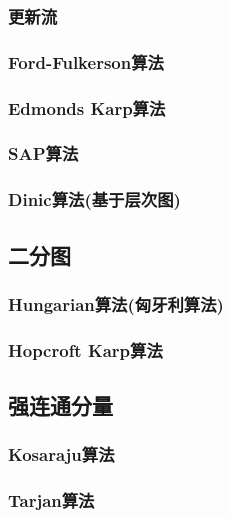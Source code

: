 \subsubsection{更新流}
\subsubsection{Ford-Fulkerson算法}
\subsubsection{Edmonds Karp算法}
\subsubsection{SAP算法}
\subsubsection{Dinic算法(基于层次图)}

\subsection{二分图}
\subsubsection{Hungarian算法(匈牙利算法)}
\subsubsection{Hopcroft Karp算法}

\subsection{强连通分量}
\subsubsection{Kosaraju算法}
\subsubsection{Tarjan算法}
